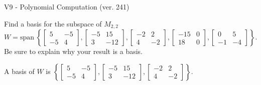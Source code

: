 \begin{exercise}
  \begin{exerciseTitle}V9 - Polynomial Computation (ver. 241)\end{exerciseTitle}
  \begin{exerciseStatement}
    Find a basis for the subspace of \(M_{2,2}\) 
\[W=\mathrm{span}\ \left\{\left[\begin{array}{cc}
5 & -5 \\
-5 & 4
\end{array}\right] , \left[\begin{array}{cc}
-5 & 15 \\
3 & -12
\end{array}\right] , \left[\begin{array}{cc}
-2 & 2 \\
4 & -2
\end{array}\right] , \left[\begin{array}{cc}
-15 & 0 \\
18 & 0
\end{array}\right] , \left[\begin{array}{cc}
0 & 5 \\
-1 & -4
\end{array}\right]\right\}.\]
 Be sure to explain why your result is a basis.


  \end{exerciseStatement}
  \begin{exerciseAnswer}
   A basis of \(W\) is  \(\left\{\left[\begin{array}{cc}
5 & -5 \\
-5 & 4
\end{array}\right] , \left[\begin{array}{cc}
-5 & 15 \\
3 & -12
\end{array}\right] , \left[\begin{array}{cc}
-2 & 2 \\
4 & -2
\end{array}\right]\right\}\).
  


  \end{exerciseAnswer}
\end{exercise}